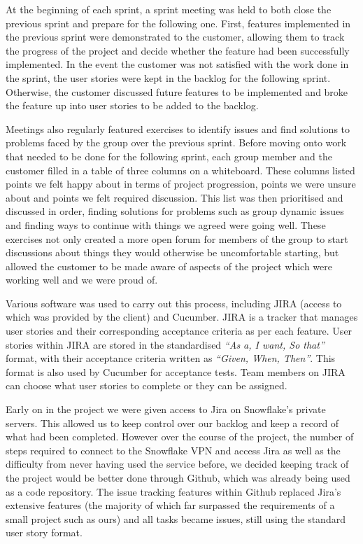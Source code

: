 \documentclass[a4paper, 12pt]{article}
\begin{document}
At the beginning of each sprint, a sprint meeting was held to both close the previous sprint and prepare for the following one. First, features implemented in the previous sprint were demonstrated to the customer, allowing them to track the progress of the project and decide whether the feature had been successfully implemented. In the event the customer was not satisfied with the work done in the sprint, the user stories were kept in the backlog for the following sprint. Otherwise, the customer discussed future features to be implemented and broke the feature up into user stories to be added to the backlog.

Meetings also regularly featured exercises to identify issues and find solutions to problems faced by the group over the previous sprint. Before moving onto work that needed to be done for the following sprint, each group member and the customer filled in a table of three columns on a whiteboard. These columns listed points we felt happy about in terms of project progression, points we were unsure about and points we felt required discussion. This list was then prioritised and discussed in order, finding solutions for problems such as group dynamic issues and finding ways to continue with things we agreed were going well. These exercises not only created a more open forum for members of the group to start discussions about things they would otherwise be uncomfortable starting, but allowed the customer to be made aware of aspects of the project which were working well and we were proud of.

Various software was used to carry out this process, including JIRA (access to which was provided by the client) and Cucumber. JIRA is a tracker that manages user stories and their corresponding acceptance criteria as per each feature. User stories within JIRA are stored in the standardised \emph{``As a, I want, So that''} format, with their acceptance criteria written as \emph{``Given, When, Then''}. This format is also used by Cucumber for acceptance tests. Team members on JIRA can choose what user stories to complete or they can be assigned.

Early on in the project we were given access to Jira on Snowflake's private servers. This allowed us to keep control over our backlog and keep a record of what had been completed. However over the course of the project, the number of steps required to connect to the Snowflake VPN and access Jira as well as the difficulty from never having used the service before, we decided keeping track of the project would be better done through Github, which was already being used as a code repository. The issue tracking features within Github replaced Jira's extensive features (the majority of which far surpassed the requirements of a small project such as ours) and all tasks became issues, still using the standard user story format.
\end{document}
